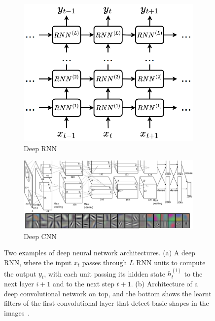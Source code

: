 \begin{figure}
    \centering
    \hfill
    \begin{subfigure}[b]{0.3\textwidth}
        \centering
        \includegraphics[width=\textwidth]{Figures/RL/deep-rnn.png}
        \caption{Deep RNN}
        \label{fig:deep-rnn}
    \end{subfigure}
    \hfill
    \begin{subfigure}[b]{0.6\textwidth}
        \centering
        \includegraphics[width=\textwidth]{Figures/RL/vgg.png}
        \caption{Deep CNN}
        \label{fig:cnn}
    \end{subfigure}
    \hfill
    \caption{Two examples of deep neural network architectures. (a) A deep RNN, where the input $x_t$ passes through $L$ RNN units to compute the output $y_t$, with each unit passing its hidden state $h^{(i)}_t$ to the next layer $i+1$ and to the next step $t+1$. (b) Architecture of a deep convolutional network on top, and the bottom shows the learnt filters of the first convolutional layer that detect basic shapes in the images~\citep{Simonyan2015_VGG}.}
    \label{fig:ann}
\end{figure}

